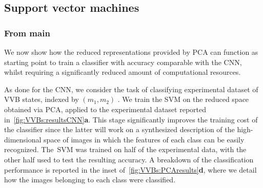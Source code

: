 \subsection{Support vector machines}
\label{sec:SVMs}

\subsubsection{From main}

We now show how the reduced representations provided by \ac{PCA} can function as starting point to train a classifier with accuracy comparable with the \ac{CNN}, whilst requiring a significantly reduced amount of computational resources.

As done for the \ac{CNN}, we consider the task of classifying experimental dataset of \ac{VVB} states, indexed by $(m_1,m_2)$ . We train the \ac{SVM} on the reduced space obtained via \ac{PCA}, applied to the experimental dataset reported in~\cref{fig:VVBs:resultsCNN}{\bf a}. This stage significantly improves the training cost of the classifier since the latter will work on a synthesized description of the high-dimensional space of images in which the features of each class can be easily recognized.
The~\ac{SVM} was trained on half of the experimental data, with the other half used to test the resulting accuracy. A breakdown of the classification performance is reported in the inset of~\cref{fig:VVBs:PCAresults}{\bf d}, where we detail how the images belonging to each class were classified.

